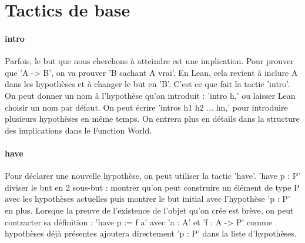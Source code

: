 \section{Tactics de base}

\paragraph{intro}

Parfois, le but que nous cherchons à atteindre est une implication. Pour prouver que 'A -> B', on va prouver 'B sachant A vrai'. En Lean, cela revient à inclure A dans les hypothèses et à changer le but en 'B'. C'est ce que fait la tactic 'intro'. On peut donner un nom à l'hypothèse qu'on introduit : 'intro h,' ou laisser Lean choisir un nom par défaut.
On peut écrire 'intros h1 h2 ... hn,' pour introduire plusieurs hypothèses en même temps.
On entrera plus en détails dans la structure des implications dans le Function World.

\paragraph{have}

Pour déclarer une nouvelle hypothèse, on peut utiliser la tactic 'have'.
'have p : P' diviser le but en 2 sous-but : montrer qu'on peut construire un élément de type P avec les hypothèses actuelles puis montrer le but initial avec l'hypothèse 'p : P' en plus.
Lorsque la preuve de l'existence de l'objet qu'on crée est brève, on peut contracter sa définition :
'have p := f a' avec 'a : A' et 'f : A -> P' comme hypothèses déjà présentes ajoutera directement 'p : P' dans la liste d'hypothèses.  
